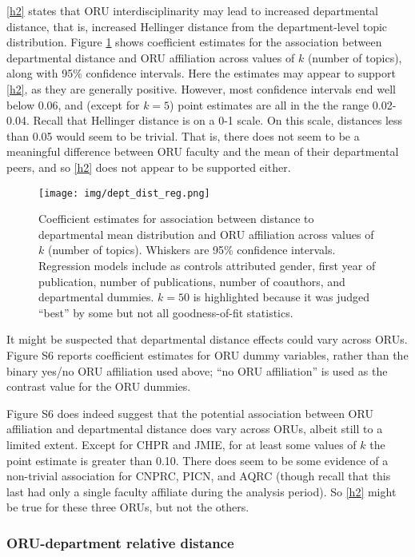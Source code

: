 \documentclass[
  11pt,
]{article}
\begin{document}
\ref{h2} states that ORU interdisciplinarity may lead to increased departmental distance, that is, increased Hellinger distance from the department-level topic distribution. Figure \ref{fig.reg.dept_dist} shows coefficient estimates for the association between departmental distance and ORU affiliation across values of \(k\) (number of topics), along with 95\% confidence intervals. Here the estimates may appear to support \ref{h2}, as they are generally positive. However, most confidence intervals end well below 0.06, and (except for \(k=5\)) point estimates are all in the the range 0.02-0.04. Recall that Hellinger distance is on a 0-1 scale. On this scale, distances less than 0.05 would seem to be trivial. That is, there does not seem to be a meaningful difference between ORU faculty and the mean of their departmental peers, and so \ref{h2} does not appear to be supported either.

\begin{figure}
\centering
\texttt{[image: img/dept\_dist\_reg.png]}
\caption{Coefficient estimates for association between distance to departmental mean distribution and ORU affiliation across values of \(k\) (number of topics). Whiskers are 95\% confidence intervals. Regression models include as controls attributed gender, first year of publication, number of publications, number of coauthors, and departmental dummies. \(k=50%
\) is highlighted because it was judged ``best'' by some but not all goodness-of-fit statistics. \label{fig.reg.dept_dist}}
\end{figure}

It might be suspected that departmental distance effects could vary across ORUs. Figure S6 reports coefficient estimates for ORU dummy variables, rather than the binary yes/no ORU affiliation used above; ``no ORU affiliation'' is used as the contrast value for the ORU dummies.

Figure S6 does indeed suggest that the potential association between ORU affiliation and departmental distance does vary across ORUs, albeit still to a limited extent. Except for CHPR and JMIE, for at least some values of \(k\) the point estimate is greater than 0.10. There does seem to be some evidence of a non-trivial association for CNPRC, PICN, and AQRC (though recall that this last had only a single faculty affiliate during the analysis period). So \ref{h2} might be true for these three ORUs, but not the others.

\hypertarget{oru-department-relative-distance}{%
\subsubsection{ORU-department relative distance}\label{oru-department-relative-distance}}
\end{document}

